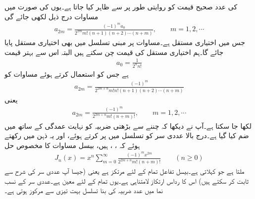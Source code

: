  کی عدد صحیح قیمت کو روایتی طور پر  سے ظاہر کیا جاتا ہے۔یوں  کی صورت میں مساوات   درج ذیل لکھی جائے گی
\begin{align}\label{مساوات_بیسل_چ}
a_{2m}=\frac{(-1)^m a_0}{2^{2m}m!(n+1)(n+2)\cdots (n+m)},\quad \quad m=1,2,\cdots
\end{align}
جس میں  اختیاری مستقل ہے۔مساوات  پر مبنی تسلسل میں بھی اختیاری مستقل  پایا جائے گا۔ہم اختیاری مستقل کی قیمت  چن سکتے ہیں البتہ اس سے بہتر قیمت 
\begin{align}\label{مساوات_بیسل_عددی_سر_الف}
a_0=\frac{1}{2^nn!}
\end{align}
ہے جس کو استعمال کرتے ہوئے مساوات  کو
\begin{align*}
a_{2m}=\frac{(-1)^m}{2^{2m+n}m!n!(n+1)(n+2)\cdots (n+m)}
\end{align*}
یعنی
\begin{align}\label{مساوات_بیسل_ح}
a_{2m}=\frac{(-1)^m}{2^{2m+n}m!(n+m)!},\quad \quad m=1,2,\cdots
\end{align}
لکھا جا سکتا ہے۔آپ نے دیکھا کہ  چننے سے  بڑھتی ضربیہ  کو نہایت عمدگی کے ساتھ   میں ضم کیا گیا ہے۔درج بالا عددی سر کو تسلسل میں پر کرتے ہوئے، اور یہ ذہن میں رکھتے ہوئے کہ ، ،  ہیں، بیسل مساوات  کا مخصوص حل 
\begin{align}\label{مساوات_بیسل_خ}
J_n(x)=x^n\sum_{m=0}^{\infty} \frac{(-1)^m x^{2m}}{2^{2m+n} m!(n+m)!} \quad \quad (n \ge 0)
\end{align}
ملتا ہے جو     کہلاتی ہے۔بیسل تفاعل  تمام  کے لئے  مرتکز ہے یعنی (جیسا آپ عددی سر کی شرح  سے ثابت کر سکتے ہیں) اس کا رداس ارتکاز لامتناہی   ہے۔یوں  تمام  کے لئے معین ہے۔عددی سر کے نسب نما میں عدد ضربیہ  کی بنا تسلسل بہت تیزی سے مرکوز ہوتی ہے۔

